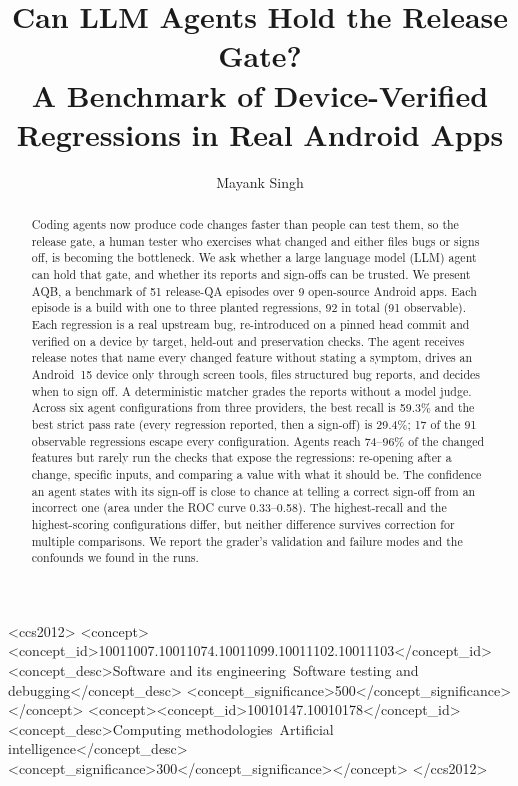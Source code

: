 \documentclass[sigconf]{acmart}
\newcommand{\aqb}{AQB\xspace}
\begin{document}
\title[Can LLM Agents Hold the Release Gate?]{Can LLM Agents Hold the Release Gate?\\
A Benchmark of Device-Verified Regressions in Real Android Apps}

\author{Mayank Singh}

\begin{abstract}
Coding agents now produce code changes faster than people can test them, so the release gate, a
human tester who exercises what changed and either files bugs or signs off, is becoming the
bottleneck. We ask whether a large language model (LLM) agent can hold that gate, and whether its
reports and sign-offs can be trusted. We present \aqb, a benchmark of 51 release-QA episodes over
9 open-source Android apps. Each episode is a build with one to three planted regressions, 92 in
total (91 observable). Each regression is a real upstream bug, re-introduced on a pinned head commit
and verified on a device by target, held-out and preservation checks. The agent receives release
notes that name every changed feature without stating a symptom, drives an Android~15 device only
through screen tools, files structured bug reports, and decides when to sign off. A deterministic
matcher grades the reports without a model judge. Across six agent configurations from three
providers, the best recall is 59.3\% and the best strict pass rate (every regression reported, then a
sign-off) is 29.4\%; 17 of the 91 observable regressions escape every configuration. Agents reach
74--96\% of the changed features but rarely run the checks that expose the regressions: re-opening
after a change, specific inputs, and comparing a value with what it should be. The confidence an
agent states with its sign-off is close to chance at telling a correct sign-off from an incorrect one
(area under the ROC curve 0.33--0.58). The highest-recall and the highest-scoring configurations
differ, but neither difference survives correction for multiple comparisons. We report the grader's
validation and failure modes and the confounds we found in the runs.
\end{abstract}

\begin{CCSXML}
<ccs2012>
<concept><concept_id>10011007.10011074.10011099.10011102.10011103</concept_id>
<concept_desc>Software and its engineering~Software testing and debugging</concept_desc>
<concept_significance>500</concept_significance></concept>
<concept><concept_id>10010147.10010178</concept_id>
<concept_desc>Computing methodologies~Artificial intelligence</concept_desc>
<concept_significance>300</concept_significance></concept>
</ccs2012>
\end{CCSXML}
\end{document}
